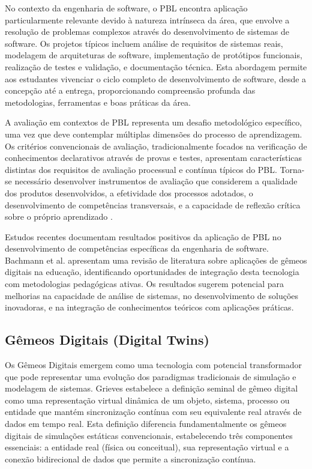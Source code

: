 \documentclass[12pt, a4paper, oneside]{abntex2}
\begin{document}
No contexto da engenharia de software, o PBL encontra aplicação particularmente relevante devido à natureza intrínseca da área, que envolve a resolução de problemas complexos através do desenvolvimento de sistemas de software. Os projetos típicos incluem análise de requisitos de sistemas reais, modelagem de arquiteturas de software, implementação de protótipos funcionais, realização de testes e validação, e documentação técnica. Esta abordagem permite aos estudantes vivenciar o ciclo completo de desenvolvimento de software, desde a concepção até a entrega, proporcionando compreensão profunda das metodologias, ferramentas e boas práticas da área.

A avaliação em contextos de PBL representa um desafio metodológico específico, uma vez que deve contemplar múltiplas dimensões do processo de aprendizagem. Os critérios convencionais de avaliação, tradicionalmente focados na verificação de conhecimentos declarativos através de provas e testes, apresentam características distintas dos requisitos de avaliação processual e contínua típicos do PBL. Torna-se necessário desenvolver instrumentos de avaliação que considerem a qualidade dos produtos desenvolvidos, a efetividade dos processos adotados, o desenvolvimento de competências transversais, e a capacidade de reflexão crítica sobre o próprio aprendizado \cite{hmelo2004}.

Estudos recentes documentam resultados positivos da aplicação de PBL no desenvolvimento de competências específicas da engenharia de software. Bachmann et al. \cite{bachmann2023} apresentam uma revisão de literatura sobre aplicações de gêmeos digitais na educação, identificando oportunidades de integração desta tecnologia com metodologias pedagógicas ativas. Os resultados sugerem potencial para melhorias na capacidade de análise de sistemas, no desenvolvimento de soluções inovadoras, e na integração de conhecimentos teóricos com aplicações práticas.

\subsection{Gêmeos Digitais (Digital Twins)}

Os Gêmeos Digitais emergem como uma tecnologia com potencial transformador que pode representar uma evolução dos paradigmas tradicionais de simulação e modelagem de sistemas. Grieves \cite{grieves2014} estabelece a definição seminal de gêmeo digital como uma representação virtual dinâmica de um objeto, sistema, processo ou entidade que mantém sincronização contínua com seu equivalente real através de dados em tempo real. Esta definição diferencia fundamentalmente os gêmeos digitais de simulações estáticas convencionais, estabelecendo três componentes essenciais: a entidade real (física ou conceitual), sua representação virtual e a conexão bidirecional de dados que permite a sincronização contínua.
\end{document}
